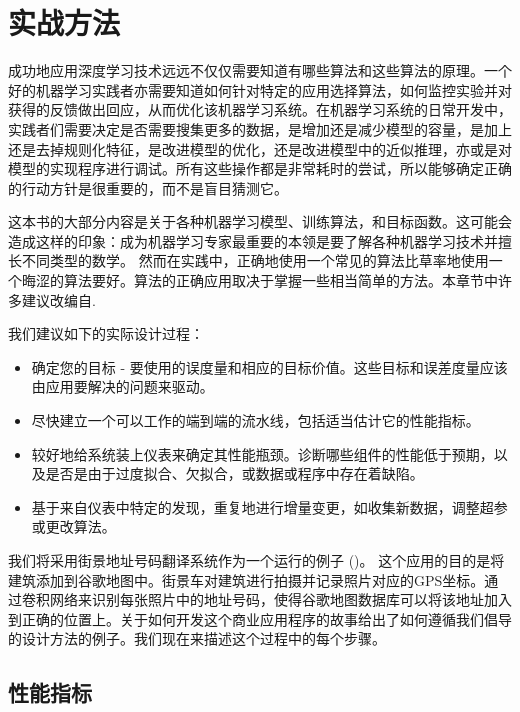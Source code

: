 \chapter{实战方法}
\label{chap:11}

成功地应用深度学习技术远远不仅仅需要知道有哪些算法和这些算法的原理。一个好的机器学习实践者亦需要知道如何针对特定的应用选择算法，如何监控实验并对获得的反馈做出回应，从而优化该机器学习系统。在机器学习系统的日常开发中，实践者们需要决定是否需要搜集更多的数据，是增加还是减少模型的容量，是加上还是去掉规则化特征，是改进模型的优化，还是改进模型中的近似推理，亦或是对模型的实现程序进行调试。所有这些操作都是非常耗时的尝试，所以能够确定正确的行动方针是很重要的，而不是盲目猜测它。

这本书的大部分内容是关于各种机器学习模型、训练算法，和目标函数。这可能会造成这样的印象：成为机器学习专家最重要的本领是要了解各种机器学习技术并擅长不同类型的数学。 然而在实践中，正确地使用一个常见的算法比草率地使用一个晦涩的算法要好。算法的正确应用取决于掌握一些相当简单的方法。本章节中许多建议改编自\cite{Ng ( 2015 )}.

我们建议如下的实际设计过程：
\begin{itemize}
\item 确定您的目标 - 要使用的误度量和相应的目标价值。这些目标和误差度量应该由应用要解决的问题来驱动。
\item 尽快建立一个可以工作的端到端的流水线，包括适当估计它的性能指标。
\item 较好地给系统装上仪表来确定其性能瓶颈。诊断哪些组件的性能低于预期，以及是否是由于过度拟合、欠拟合，或数据或程序中存在着缺陷。
\item 基于来自仪表中特定的发现，重复地进行增量变更，如收集新数据，调整超参或更改算法。
\end{itemize}

我们将采用街景地址号码翻译系统作为一个运行的例子 (\cite{ Goodfellow et al. , 2014d })。 这个应用的目的是将建筑添加到谷歌地图中。街景车对建筑进行拍摄并记录照片对应的GPS坐标。通过卷积网络来识别每张照片中的地址号码，使得谷歌地图数据库可以将该地址加入到正确的位置上。关于如何开发这个商业应用程序的故事给出了如何遵循我们倡导的设计方法的例子。我们现在来描述这个过程中的每个步骤。

\section{性能指标}

